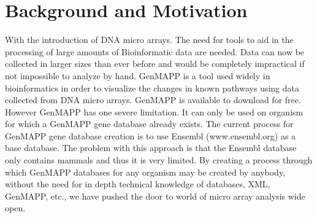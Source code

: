 \section{Background and Motivation}
With the introduction of DNA micro arrays. The need for tools to aid in the processing of large amounts of Bioinformatic data are needed.  Data can now be collected in larger sizes than ever before and would be completely impractical if not impossible to analyze by hand.  GenMAPP is a tool used widely in bioinformatics in order to visualize the changes in known pathways using data collected from DNA micro arrays. GenMAPP is available to download for free. However GenMAPP has one severe limitation.  It can only be used on organism for which a GenMAPP gene database already exists.  The current process for GenMAPP gene database creation is to use Ensembl (www.ensembl.org) as a base database.   The problem with this approach is that the Ensembl database only contains mammals and thus it is very limited.  By creating a process through which GenMAPP databases for any organism may be created by anybody, without the need for in depth technical knowledge of databases, XML, GenMAPP, etc., we have pushed the door to world of micro array analysis wide open.

\cite{GenMAPP:ng} \cite{mappfinder:gb} \cite{GenMAPP:bax}


